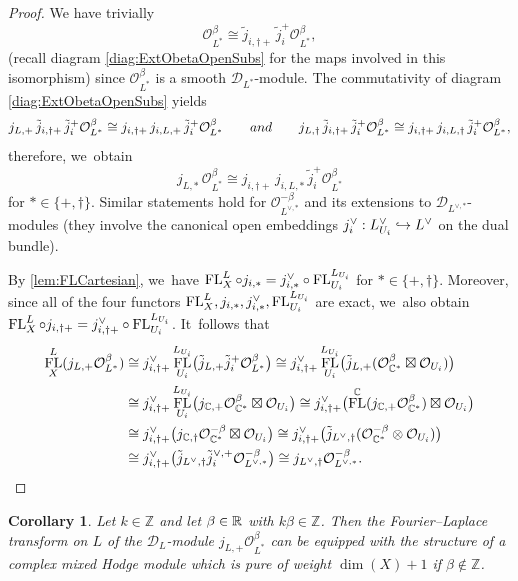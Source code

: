 \documentclass[11pt]{article}
\let\mathds\mathbb
\newcommand\hto{\mathrel{\lhook\joinrel\to}}
\newtheorem{cor}[thm]{Corollary}
\newcommand{\dC}{{\mathds C}}\let\C\dC
\newcommand{\dZ}{{\mathds Z}}\let\mbz\dZ\let\Z\dZ
\newcommand{\cD}{\mathscr{D}}
\newcommand{\cO}{\mathcal{O}}\let\O\cO
\DeclareMathOperator{\FL}{\textup{FL}}
\begin{document}
\begin{proof}
We have trivially
\[
\cO^\beta_{L^{*}} \cong \tilde{j}_{i,\dag+}\, \tilde{j}_i^+ \cO^\beta_{L^{*}},
\]
(recall diagram \eqref{diag:ExtObetaOpenSubs} for the maps involved in this isomorphism) since $\cO_{L^*}^\beta$ is a smooth $\cD_{L^*}$\nobreakdash-mod\-ule. The commutativity of
diagram \eqref{diag:ExtObetaOpenSubs} yields
\[
j_{L,+}\,\tilde{j}_{i,\dag+}\, \tilde{j}_i^+\cO_{L^*}^\beta \cong j_{i,\dag+}\, j_{i,L,+}\, \tilde{j}_i^+\cO_{L^*}^\beta
\quad\quad
\textup{and}
\quad\quad
j_{L,\dag}\,\tilde{j}_{i,\dag+}\, \tilde{j}_i^+\cO_{L^*}^\beta \cong j_{i,\dag+}\, j_{i,L,\dag}\, \tilde{j}_i^+\cO_{L^*}^\beta,
\]
therefore, we~obtain
\[
j_{L,\ast}\, \cO_{L^*}^\beta \cong j_{i,\dag+}\, j_{i,L,\ast}\, \tilde{j}_i^+\cO_{L^*}^\beta
\]
for $\ast\in\{+,\dag\}$.
Similar statements hold for $\cO_{L^{\vee,*}}^{-\beta}$ and its extensions to $\cD_{L^{\vee,*}}$\nobreakdash-mod\-ules (they involve the canonical open embeddings $j_i^\vee:L^\vee_{U_i}\hto L^\vee$ on the dual bundle).

By \cref{lem:FLCartesian}, we~have $\FL^L_X \circ j_{i,\ast}=j^\vee_{i,\ast}\circ\FL^{L_{U_i}}_{U_i}$ for $\ast\in\{+,\dag\}$. Moreover, since
all of the four functors $\FL^L_X, j_{i,\ast}, j^\vee_{i,\ast}, \FL^{L_{U_i}}_{U_i}$
are exact, we~also obtain $\FL^L_X \circ j_{i,\dag+}=j^\vee_{i,\dag+}\circ\FL^{L_{U_i}}_{U_i}$. It~follows that
\begin{align*}
\FL^L_X(j_{L,+} \O_{L^{*}}^{\beta})
&\cong 
j^\vee_{i,\dag+} \FL^{L_{U_i}}_{U_i} \bigl(\tilde{j}_{L,+} \tilde{j}_{i}^+ \cO^\beta_{L^{*}} \bigr)
\cong 
j^\vee_{i,\dag+} \FL^{L_{U_i}}_{U_i} \bigl(\tilde{j}_{L,+}(\cO_{\dC^*}^\beta\boxtimes\cO_{U_i}) \bigr)
\\
&\cong j^\vee_{i,\dag+} \FL^{L_{U_i}}_{U_i} \bigl(j_{\dC,+}\cO_{\dC^*}^\beta\boxtimes\cO_{U_i}\bigr)
\cong j^\vee_{i,\dag+} \bigl(\FL^{\dC} (j_{\dC,+}\cO_{\dC^*}^\beta)\boxtimes\cO_{U_i}\bigr)
\\
&\cong j^\vee_{i,\dag+} \bigl(j_{\dC,\dag}\cO_{\dC^*}^{-\beta}\boxtimes\cO_{U_i}\bigr)
\cong j^\vee_{i,\dag+} \bigl(\tilde{j}_{L^\vee,\dag}(\cO_{\dC^*}^{-\beta}\otimes \cO_{U_i})\bigr)
\\
&\cong j^\vee_{i,\dag+} \bigl(\tilde{j}_{L^\vee,\dag} \tilde{j}_i^{\vee,+}\cO^{-\beta}_{L^{\vee,*}}\bigr)
\cong j_{L^\vee,\dag}\cO^{-\beta}_{L^{\vee,*}}.\qedhere
\end{align*}
\end{proof}

\begin{cor} \label{cor:FLofOBetaIsMHM}
Let $k \in \Z$ and let $\beta \in \R$ with $k\beta \in \Z$. Then the Fourier--Laplace transform on $L$ of the $\mathscr{D}_{L}$\nobreakdash-mod\-ule $j_{L,+}\O_{L^*}^\beta$ can be equipped with the structure of a complex mixed Hodge module which is pure of weight $\dim(X)+1$ if $\beta\notin \dZ$.
\end{cor}
\end{document}
